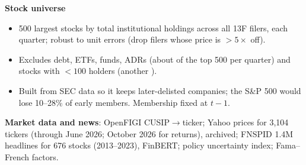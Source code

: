 \documentclass[11pt]{article}
\begin{document}
\textbf{Stock universe}
\begin{itemize}
  \item 500 largest stocks by total institutional holdings across all 13F filers,
  each quarter; robust to unit errors (drop filers whose price is $>5\times$ off).
  \item Excludes debt, ETFs, funds, ADRs (about \univtype{} of the top 500 per
  quarter) and stocks with $<100$ holders (another \univholders).
  \item Built from SEC data so it keeps later-delisted companies; the S\&P 500
  would lose 10--28\% of early members. Membership fixed at $t-1$.
\end{itemize}
\textbf{Market data and news}: OpenFIGI CUSIP$\to$ticker; Yahoo prices for
3,104 tickers (through June 2026; October 2026 for returns), archived; FNSPID
1.4M headlines for 676 stocks (2013--2023), FinBERT; policy uncertainty index;
Fama--French factors.

\end{document}
